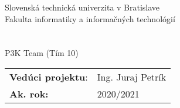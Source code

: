 \newcommand{\fiitmark}{%
\large
\textnormal{%
Slovenská technická univerzita v Bratislave \\
\vspace*{.25cm}
Fakulta informatiky a informačných technológií} \\
}

\begin{titlepage}
        \begin{center}
            \vspace*{.5cm}
            \fiitmark

            \vfill
            \huge
            \textbf{\documenttitle} \\

            \vspace*{.25cm}
            \large
            \textbf{\documentsubtitle} \\

            \vspace*{.25cm}
            \textnormal{P3K Team (Tím 10)} \\

        \end{center}

        \vfill

        \begin{table}[h]
            \begin{tabular}{ll}
                \textbf{Vedúci projektu}: & Ing. Juraj Petrík \\
                \textbf{Ak. rok:} & 2020/2021 \\
            \end{tabular}
            \label{tab:grades}
        \end{table}
\end{titlepage}
